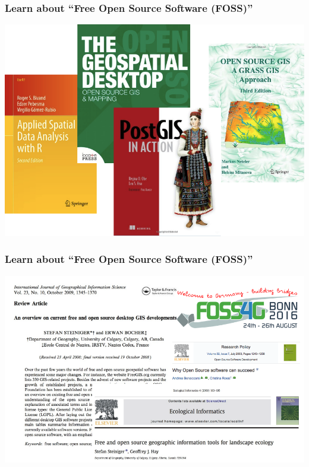 \documentclass{beamer}
\begin{document}

\begin{frame}
\frametitle{Learn about ``Free Open Source Software (FOSS)''}
\centering
\includegraphics[width=\textwidth]{Figures/FOSS_books.png}
\end{frame}


\begin{frame}
\frametitle{Learn about ``Free Open Source Software (FOSS)''}
\centering
\includegraphics[width=\textwidth]{Figures/FOSS_articles.png}
\end{frame}

\end{document}
